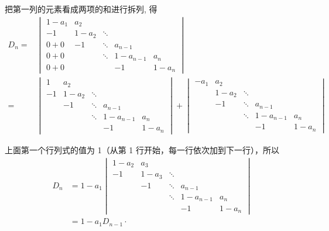 \begin{solution}
    把第一列的元素看成两项的和进行拆列, 得
    \begin{align*}
        D_n= & \begin{vmatrix}
                   1-a_{1} & a_{2}   &        &           &         \\
                   -1      & 1-a_{2} & \ddots &           &         \\
                   0 + 0   & -1      & \ddots & a_{n-1}   &         \\
                   0 + 0   &         & \ddots & 1-a_{n-1} & a_{n}   \\
                   0 + 0   &         &        & -1        & 1-a_{n}
               \end{vmatrix}                \\
        =    & \begin{vmatrix}
                   1  & a_{2}   &        &           &         \\
                   -1 & 1-a_{2} & \ddots &           &         \\
                      & -1      & \ddots & a_{n-1}   &         \\
                      &         & \ddots & 1-a_{n-1} & a_{n}   \\
                      &         &        & -1        & 1-a_{n}
               \end{vmatrix} + \begin{vmatrix}
                                   -a_{1} & a_{2}   &        &           &         \\
                                          & 1-a_{2} & \ddots &           &         \\
                                          & -1      & \ddots & a_{n-1}   &         \\
                                          &         & \ddots & 1-a_{n-1} & a_{n}   \\
                                          &         &        & -1        & 1-a_{n}
                               \end{vmatrix}
    \end{align*}

    上面第一个行列式的值为 1（从第 1 行开始，每一行依次加到下一行），所以
    \[ \begin{aligned}
            D_n & =1-a_{1}\begin{vmatrix}
                              1-a_{2} & a_{3}   &        &           &         \\
                              -1      & 1-a_{3} & \ddots &           &         \\
                                      & -1      & \ddots & a_{n-1}   &         \\
                                      &         & \ddots & 1-a_{n-1} & a_{n}   \\
                                      &         &        & -1        & 1-a_{n}
                          \end{vmatrix} \\
                & =1-a_{1} D_{n-1} \cdot
        \end{aligned} \]


\end{solution}
